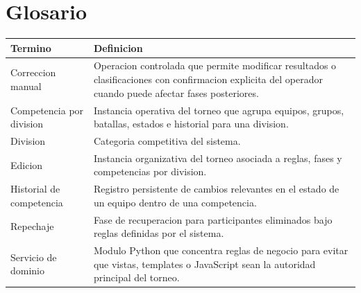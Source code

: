 \chapter*{Glosario}

\begin{longtable}{p{4cm}p{8.3cm}}
\toprule
Termino & Definicion \\
\midrule
Correccion manual & Operacion controlada que permite modificar resultados o clasificaciones con confirmacion explicita del operador cuando puede afectar fases posteriores. \\
Competencia por division & Instancia operativa del torneo que agrupa equipos, grupos, batallas, estados e historial para una division. \\
Division & Categoria competitiva del sistema. \\
Edicion & Instancia organizativa del torneo asociada a reglas, fases y competencias por division. \\
Historial de competencia & Registro persistente de cambios relevantes en el estado de un equipo dentro de una competencia. \\
Repechaje & Fase de recuperacion para participantes eliminados bajo reglas definidas por el sistema. \\
Servicio de dominio & Modulo Python que concentra reglas de negocio para evitar que vistas, templates o JavaScript sean la autoridad principal del torneo. \\
\bottomrule
\end{longtable}

\cleardoublepage
